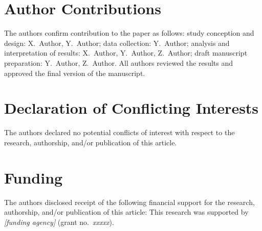\documentclass[10pt,numbered]{trbunofficial}
\begin{document}
\section{Author Contributions}
The authors confirm contribution to the paper as follows: study conception and
design: X.~Author, Y.~Author; data collection: Y.~Author; analysis and
interpretation of results: X.~Author, Y.~Author, Z.~Author; draft manuscript
preparation: Y.~Author, Z.~Author. All authors reviewed the results and
approved the final version of the manuscript.

\section{Declaration of Conflicting Interests}
The authors declared no potential conflicts of interest with respect to the
research, authorship, and/or publication of this article.


\section{Funding}
The authors disclosed receipt of the following financial support for the
research, authorship, and/or publication of this article: This research was
supported by \emph{[funding agency]} (grant no.~\emph{xxxxx}).


\newpage


\end{document}
